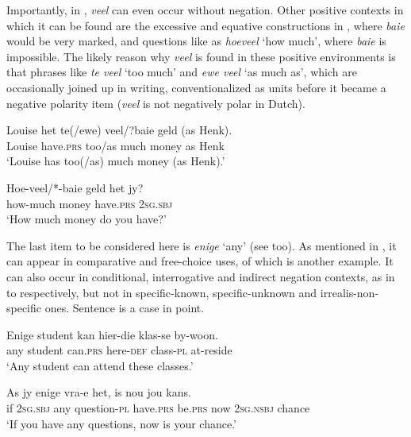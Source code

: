 \documentclass[output=paper,colorlinks,citecolor=brown]{langscibook}
\begin{document}
Importantly, in , \textit{veel} can even occur without negation. Other positive contexts in which it can be found are the excessive and equative constructions in , where \textit{baie} would be very marked, and questions like  as \textit{hoeveel} ‘how much’, where \textit{baie} is impossible. The likely reason why \textit{veel} is found in these positive environments is that phrases like \textit{te veel} ‘too much’ and \textit{ewe veel} ‘as much as’, which are occasionally joined up in writing, conventionalized as units before it became a negative polarity item (\textit{veel} is not negatively polar in Dutch).

\ea\label{ex:afr:41}
    \ea\label{ex:afr:41a}
        \gll Louise het te(/ewe) veel/?baie geld (as Henk). \\ 
             Louise have.\textsc{prs} too/as much money as Henk \\
        \glt  ‘Louise has too(/as) much money (as Henk).’
    
    \ex\label{ex:afr:41b}
        \gll Hoe-veel/*-baie geld het jy? \\
             how-much money have.\textsc{prs} \textsc{2sg.sbj} \\
        \glt ‘How much money do you have?’
    \z
\z  

The last item to be considered here is \textit{enige} ‘any’ (see \citealt[159--160]{Donaldson1993} too). As mentioned in , it can appear in  comparative and free-choice uses, of which  is another example. It can also occur in conditional, interrogative and indirect negation contexts, as in  to  respectively, but not in specific-known, specific-unknown and irrealis-non-specific ones. Sentence  is a case in point.

\ea\label{ex:afr:42}
    \ea\label{ex:afr:42a}
        \gll Enige student kan hier-die klas-se by-woon. \\ 
             any student can.\textsc{prs} here-\textsc{def} class-\textsc{pl} at-reside \\
        \glt ‘Any student can attend these classes.’
    
    \ex\label{ex:afr:42b}
        \gll As jy enige vra-e het, is nou jou kans. \\
             if \textsc{2sg.sbj} any question-\textsc{pl} have.\textsc{prs} be.\textsc{prs} now \textsc{2sg.nsbj} chance \\
        \glt ‘If you have any questions, now is your chance.’
\end{document}
